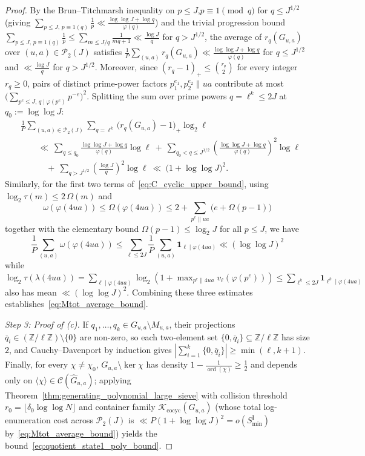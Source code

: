 \documentclass[11pt, a4paper]{article}
\theoremstyle{plain}
\theoremstyle{definition}
\newcommand{\Z}{\mathbb{Z}}
\begin{document}
\begin{proof}
By the Brun--Titchmarsh inequality on $p\le J$,\linebreak $p\equiv 1\pmod q$ for $q\le J^{1/2}$ (giving $\sum_{p\le J,\,p\equiv 1(q)}\frac1p\ll\frac{\log\log J+\log q}{\varphi(q)}$) and the trivial progression bound $\sum_{p\le J,\,p\equiv 1(q)}\frac1p\le\sum_{m\le J/q}\frac{1}{mq+1}\ll\frac{\log J}{q}$ for $q>J^{1/2}$, the average of $r_q(G_{u,a})$ over $(u,a)\in\mathcal{P}_2(J)$ satisfies $\frac1P\sum_{(u,a)}r_q(G_{u,a})\ll\frac{\log\log J+\log q}{\varphi(q)}$ for $q\le J^{1/2}$ and $\ll\frac{\log J}{q}$ for $q>J^{1/2}$. Moreover, since $(r_q-1)_{+}\le\binom{r_q}{2}$ for every integer $r_q\ge 0$, pairs of distinct prime-power factors $p_1^{e_1},p_2^{e_2}\parallel ua$ contribute at most $\big(\sum_{p^{e}\le J,\,q\mid\varphi(p^{e})}p^{-e}\big)^{2}$. Splitting the sum over prime powers $q=\ell^{k}\le 2J$ at $q_0:=\log\log J$:
\[
\begin{aligned}
&\frac1P\sum_{(u,a)\in\mathcal{P}_2(J)}\sum_{q=\ell^{k}}\big(r_q(G_{u,a})-1\big)_{+}\log_2\ell \\
&\qquad\ll\ \sum_{q\le q_0}\frac{\log\log J+\log q}{\varphi(q)}\log\ell\ +\ \sum_{q_0<q\le J^{1/2}}\left(\frac{\log\log J+\log q}{\varphi(q)}\right)^{2}\log\ell \\
&\qquad\quad +\ \sum_{q>J^{1/2}}\left(\frac{\log J}{q}\right)^{2}\log\ell\ \ll\ \big(1+\log\log J\big)^{2}.
\end{aligned}
\]
Similarly, for the first two terms of~\eqref{eq:C_cyclic_upper_bound}, using $\log_2\tau(m)\le 2\,\Omega(m)$ and 
\[
\omega(\varphi(4ua))\le\Omega(\varphi(4ua))\le 2+\sum_{p^{e}\parallel ua}\big(e+\Omega(p-1)\big)
\]
together with the elementary bound $\Omega(p-1)\le\log_2 J$ for all $p\le J$, we have 
\[
\frac1P\sum_{(u,a)}\omega(\varphi(4ua))\le\sum_{\ell\le 2J}\frac1P\sum_{(u,a)}\mathbf{1}_{\ell\mid\varphi(4ua)}\ll(\log\log J)^{2}
\]
while $\log_2\tau(\lambda(4ua))=\sum_{\ell\mid\varphi(4ua)}\log_2(1+\max_{p^{e}\parallel 4ua}v_\ell(\varphi(p^{e})))\le\sum_{\ell^{k}\le 2J}\mathbf{1}_{\ell^{k}\mid\varphi(4ua)}$ also has mean $\ll(\log\log J)^{2}$. Combining these three estimates establishes~\eqref{eq:Mtot_average_bound}.

\medskip\noindent\emph{Step 3: Proof of (c).}
If $q_1,\dots,q_k\in G_{u,a}\setminus M_{u,a}$, their projections $\overline{q}_i\in(\Z/\ell\Z)\setminus\{0\}$ are non-zero, so each two-element set $\{0,\overline{q}_i\}\subseteq\Z/\ell\Z$ has size $2$, and Cauchy--Davenport by induction gives $|\sum_{i=1}^{k}\{0,\overline{q}_i\}|\ge\min(\ell,k+1)$. Finally, for every $\chi\neq\chi_0$, $G_{u,a}\setminus\ker\chi$ has density $1-\frac{1}{\operatorname{ord}(\chi)}\ge\frac12$ and depends only on $\langle\chi\rangle\in\mathcal{C}(\widehat{G}_{u,a})$; applying Theorem~\ref{thm:generating_polynomial_large_sieve} with collision threshold $r_0=\lfloor\delta_0\log\log N\rfloor$ and container family $\mathcal{K}_{\mathrm{cocyc}}(G_{u,a})$ (whose total log-enumeration cost across $\mathcal{P}_2(J)$ is $\ll P(1+\log\log J)^{2}=o(S_{\min}^{\mathrm{I}})$ by~\eqref{eq:Mtot_average_bound}) yields the bound~\eqref{eq:quotient_state1_poly_bound}.
\end{proof}
\end{document}
